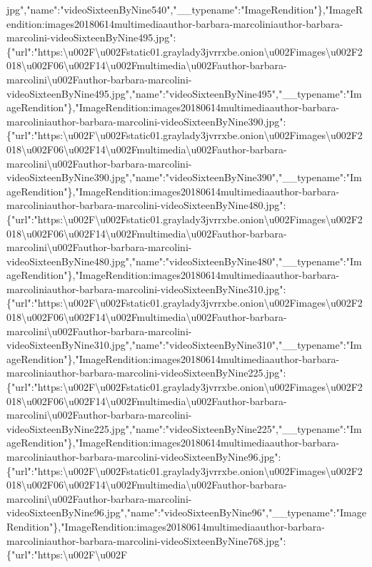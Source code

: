 jpg","name":"videoSixteenByNine540","\_\_typename":"ImageRendition"\},"ImageRendition:images20180614multimediaauthor-barbara-marcoliniauthor-barbara-marcolini-videoSixteenByNine495.jpg":\{"url":"https:\textbackslash{}u002F\textbackslash{}u002Fstatic01.graylady3jvrrxbe.onion\textbackslash{}u002Fimages\textbackslash{}u002F2018\textbackslash{}u002F06\textbackslash{}u002F14\textbackslash{}u002Fmultimedia\textbackslash{}u002Fauthor-barbara-marcolini\textbackslash{}u002Fauthor-barbara-marcolini-videoSixteenByNine495.jpg","name":"videoSixteenByNine495","\_\_typename":"ImageRendition"\},"ImageRendition:images20180614multimediaauthor-barbara-marcoliniauthor-barbara-marcolini-videoSixteenByNine390.jpg":\{"url":"https:\textbackslash{}u002F\textbackslash{}u002Fstatic01.graylady3jvrrxbe.onion\textbackslash{}u002Fimages\textbackslash{}u002F2018\textbackslash{}u002F06\textbackslash{}u002F14\textbackslash{}u002Fmultimedia\textbackslash{}u002Fauthor-barbara-marcolini\textbackslash{}u002Fauthor-barbara-marcolini-videoSixteenByNine390.jpg","name":"videoSixteenByNine390","\_\_typename":"ImageRendition"\},"ImageRendition:images20180614multimediaauthor-barbara-marcoliniauthor-barbara-marcolini-videoSixteenByNine480.jpg":\{"url":"https:\textbackslash{}u002F\textbackslash{}u002Fstatic01.graylady3jvrrxbe.onion\textbackslash{}u002Fimages\textbackslash{}u002F2018\textbackslash{}u002F06\textbackslash{}u002F14\textbackslash{}u002Fmultimedia\textbackslash{}u002Fauthor-barbara-marcolini\textbackslash{}u002Fauthor-barbara-marcolini-videoSixteenByNine480.jpg","name":"videoSixteenByNine480","\_\_typename":"ImageRendition"\},"ImageRendition:images20180614multimediaauthor-barbara-marcoliniauthor-barbara-marcolini-videoSixteenByNine310.jpg":\{"url":"https:\textbackslash{}u002F\textbackslash{}u002Fstatic01.graylady3jvrrxbe.onion\textbackslash{}u002Fimages\textbackslash{}u002F2018\textbackslash{}u002F06\textbackslash{}u002F14\textbackslash{}u002Fmultimedia\textbackslash{}u002Fauthor-barbara-marcolini\textbackslash{}u002Fauthor-barbara-marcolini-videoSixteenByNine310.jpg","name":"videoSixteenByNine310","\_\_typename":"ImageRendition"\},"ImageRendition:images20180614multimediaauthor-barbara-marcoliniauthor-barbara-marcolini-videoSixteenByNine225.jpg":\{"url":"https:\textbackslash{}u002F\textbackslash{}u002Fstatic01.graylady3jvrrxbe.onion\textbackslash{}u002Fimages\textbackslash{}u002F2018\textbackslash{}u002F06\textbackslash{}u002F14\textbackslash{}u002Fmultimedia\textbackslash{}u002Fauthor-barbara-marcolini\textbackslash{}u002Fauthor-barbara-marcolini-videoSixteenByNine225.jpg","name":"videoSixteenByNine225","\_\_typename":"ImageRendition"\},"ImageRendition:images20180614multimediaauthor-barbara-marcoliniauthor-barbara-marcolini-videoSixteenByNine96.jpg":\{"url":"https:\textbackslash{}u002F\textbackslash{}u002Fstatic01.graylady3jvrrxbe.onion\textbackslash{}u002Fimages\textbackslash{}u002F2018\textbackslash{}u002F06\textbackslash{}u002F14\textbackslash{}u002Fmultimedia\textbackslash{}u002Fauthor-barbara-marcolini\textbackslash{}u002Fauthor-barbara-marcolini-videoSixteenByNine96.jpg","name":"videoSixteenByNine96","\_\_typename":"ImageRendition"\},"ImageRendition:images20180614multimediaauthor-barbara-marcoliniauthor-barbara-marcolini-videoSixteenByNine768.jpg":\{"url":"https:\textbackslash{}u002F\textbackslash{}u002F